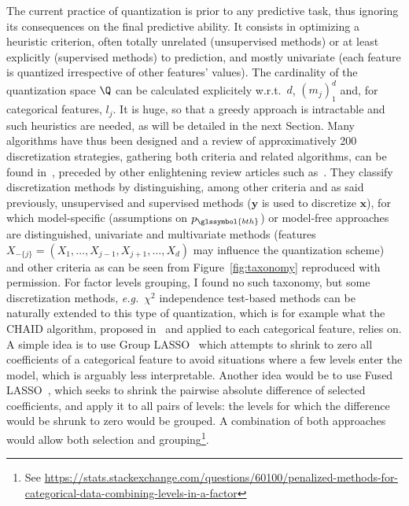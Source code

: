 The current practice of quantization is prior to any predictive task, thus ignoring its consequences on the final predictive ability. It consists in optimizing a heuristic criterion, often totally unrelated (unsupervised methods) or at least explicitly (supervised methods) to prediction, and mostly univariate (each feature is quantized irrespective of other features' values). The cardinality of the quantization space $\Q$ can be calculated explicitely w.r.t.\ $d$, $(m_j)_1^d$ and, for categorical features, $l_j$. It is huge, so that a greedy approach is intractable and such heuristics are needed, as will be detailed in the next Section.
Many algorithms have thus been designed and a review of approximatively 200 discretization strategies, gathering both criteria and related algorithms, can be found in~\cite{ramirez2016data}, preceded by other enlightening review articles such as~\cite{dougherty1995supervised,liu2002discretization}. They classify discretization methods by distinguishing, among other criteria and as said previously, unsupervised and supervised methods ($\bm{y}$ is used to discretize $\bm{x}$), for which model-specific (assumptions on $p_{\glssymbol{bth}}$) or model-free approaches are distinguished, univariate and multivariate methods (features $X_{-\{j\}} = (X_{1},\ldots,X_{j-1},X_{j+1},\ldots,X_{d})$ may influence the quantization scheme) and other criteria as can be seen from Figure~\ref{fig:taxonomy} reproduced with permission. For factor levels grouping, I found no such taxonomy, but some discretization methods, \textit{e.g.}\ $\chi^2$ independence test-based methods can be naturally extended to this type of quantization, which is for example what the CHAID algorithm, proposed in~\cite{kass1980exploratory} and applied to each categorical feature, relies on. A simple idea is to use Group LASSO~\cite{meier2008group} which attempts to shrink to zero all coefficients of a categorical feature to avoid situations where a few levels enter the model, which is arguably less interpretable. Another idea would be to use Fused LASSO~\cite{tibshirani2005sparsity}, which seeks to shrink the pairwise absolute difference of selected coefficients, and apply it to all pairs of levels: the levels for which the difference would be shrunk to zero would be grouped. A combination of both approaches would allow both selection and grouping\footnote{See \url{https://stats.stackexchange.com/questions/60100/penalized-methods-for-categorical-data-combining-levels-in-a-factor}}.
